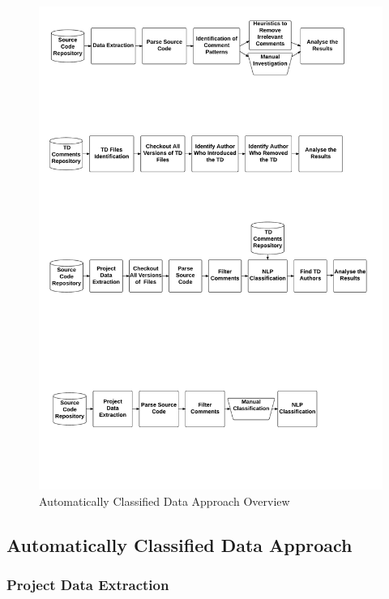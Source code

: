 \begin{figure}[thb!]
  \centering
  \includegraphics[width=1\textwidth]{figures/automatically_classified_data_approach.pdf}
  \caption{Automatically Classified Data Approach Overview}
  \label{fig:automatically_classified_data_approach_overview}
\end{figure}

\subsection*{Automatically Classified Data Approach}
\label{sub:automatically_classified_data_approach}

\subsubsection*{Project Data Extraction}
\label{subsub:project_data_extraction}

